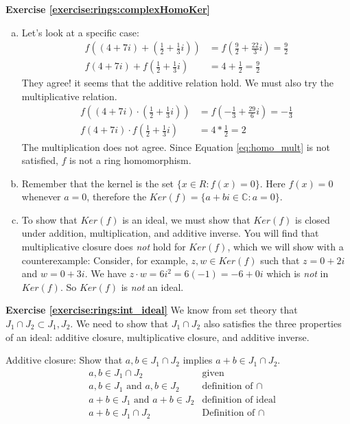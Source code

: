 \noindent\textbf{Exercise \ref{exercise:rings:complexHomoKer}}
\begin{enumerate}[(a)]
\item Let's look at a specific case:
\begin{align*}
f((4+7i)+(\frac{1}{2}+\frac{1}{3}i))&=f(\frac{9}{2}+\frac{22}{3}i)=\frac{9}{2}\\
f(4+7i)+f(\frac{1}{2}+\frac{1}{3}i)&=4+\frac{1}{2}=\frac{9}{2}
\end{align*}
They agree! it seems that the additive relation hold. We must also try the multiplicative relation.
\begin{align*}
f((4+7i)\cdot(\frac{1}{2}+\frac{1}{3}i))&=f(-\frac{1}{3}+\frac{29}{6}i)=-\frac{1}{3}\\
f(4+7i)\cdot f(\frac{1}{2}+\frac{1}{3}i)&=4*\frac{1}{2}=2
\end{align*}
The multiplication does not agree. Since Equation \eqref{eq:homo_mult} is not satisfied, $f$ is not a ring homomorphism.
\item Remember that the kernel is the set $\{x\in R: f(x)=0\}$. Here $f(x)=0$ whenever $a=0$, therefore the $Ker(f)=\{a+bi\in{\mathbb C}: a=0\}$.
\item To show that $Ker(f)$ is an ideal, we must show that $Ker(f)$ is closed under addition, multiplication, and additive inverse.
You will find that multiplicative closure does \emph{not} hold for $Ker(f)$, which we will show with a counterexample:
Consider, for example, $z,w\in Ker(f)$ such that $z=0+2i$ and $w=0+3i$. We have $z\cdot w=6i^2=6(-1)=-6+0i$ which is \emph{not} in $Ker(f)$.  So $Ker(f)$ is \emph{not} an ideal.
\end{enumerate}


\noindent\textbf{Exercise \ref{exercise:rings:int_ideal}}
We know from set theory that $J_1\cap J_2\subset J_1,J_2$.  We need to show that $J_1\cap J_2$ also satisfies the three properties of an ideal:  additive closure, multiplicative closure, and additive inverse.

Additive closure: Show that $a,b\in J_1\cap J_2$ implies $a+b\in J_1\cap J_2$.
\begin{align*}
&a,b\in J_1\cap J_2 & \text{given}\\
&a,b\in J_1\text{ and }a,b\in J_2& \text{definition of $\cap$}\\
&\text{$a+b\in J_1$ and $a+b\in J_2$} & \text{definition of ideal}\\
&a+b\in J_1\cap J_2 & \text{Definition of $\cap$}
\end{align*}

